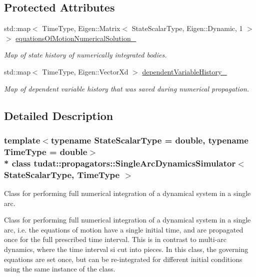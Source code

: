 \subsection*{Protected Attributes}
\begin{DoxyCompactItemize}
\item 
std\+::map$<$ Time\+Type, Eigen\+::\+Matrix$<$ State\+Scalar\+Type, Eigen\+::\+Dynamic, 1 $>$ $>$ \hyperlink{classtudat_1_1propagators_1_1SingleArcDynamicsSimulator_a8c3990a00766f47593394f56cc06eede}{equations\+Of\+Motion\+Numerical\+Solution\+\_\+}
\begin{DoxyCompactList}\small\item\em Map of state history of numerically integrated bodies. \end{DoxyCompactList}\item 
std\+::map$<$ Time\+Type, Eigen\+::\+Vector\+Xd $>$ \hyperlink{classtudat_1_1propagators_1_1SingleArcDynamicsSimulator_ad75ba09d254466d72e1d19c83558e148}{dependent\+Variable\+History\+\_\+}\hypertarget{classtudat_1_1propagators_1_1SingleArcDynamicsSimulator_ad75ba09d254466d72e1d19c83558e148}{}\label{classtudat_1_1propagators_1_1SingleArcDynamicsSimulator_ad75ba09d254466d72e1d19c83558e148}

\begin{DoxyCompactList}\small\item\em Map of dependent variable history that was saved during numerical propagation. \end{DoxyCompactList}\end{DoxyCompactItemize}


\subsection{Detailed Description}
\subsubsection*{template$<$typename State\+Scalar\+Type = double, typename Time\+Type = double$>$\\*
class tudat\+::propagators\+::\+Single\+Arc\+Dynamics\+Simulator$<$ State\+Scalar\+Type, Time\+Type $>$}

Class for performing full numerical integration of a dynamical system in a single arc. 

Class for performing full numerical integration of a dynamical system in a single arc, i.\+e. the equations of motion have a single initial time, and are propagated once for the full prescribed time interval. This is in contrast to multi-\/arc dynamics, where the time interval si cut into pieces. In this class, the governing equations are set once, but can be re-\/integrated for different initial conditions using the same instance of the class. 

